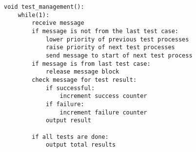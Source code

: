 \documentclass[oneside]{article}
\begin{document}
\begin{lstlisting}
void test_management():
    while(1):
        receive message
        if message is not from the last test case:
            lower priority of previous test processes
            raise priority of next test processes
            send message to start of next test process
        if message is from last test case:
            release message block
        check message for test result:
            if successful:
                increment success counter
            if failure:
                increment failure counter
            output result
        
        if all tests are done:
            output total results
\end{lstlisting}
\end{document}
